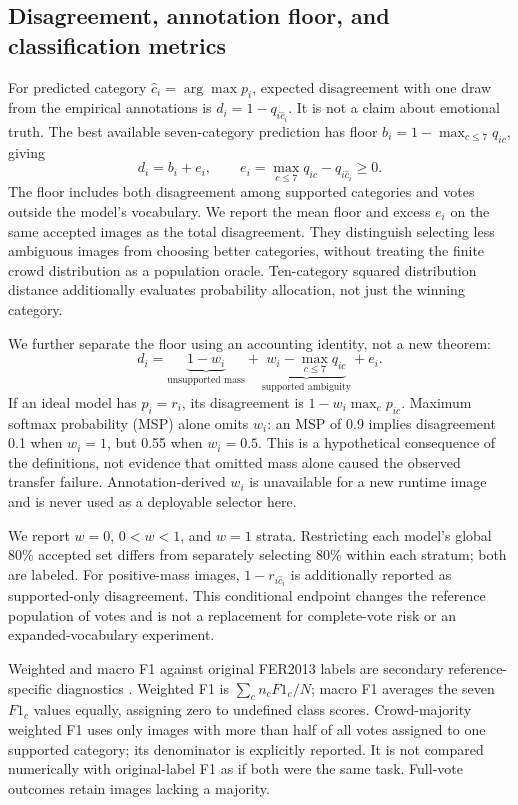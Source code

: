 \documentclass[pdflatex,sn-mathphys-num]{sn-jnl}
\begin{document}
\subsection{Disagreement, annotation floor, and classification metrics}
For predicted category $\hat c_i=\arg\max p_i$, expected disagreement with one draw from the empirical annotations is $d_i=1-q_{i\hat c_i}$. It is not a claim about emotional truth. The best available seven-category prediction has floor $b_i=1-\max_{c\leq7}q_{ic}$, giving
\begin{equation}
d_i=b_i+e_i,\qquad e_i=\max_{c\leq7}q_{ic}-q_{i\hat c_i}\geq0.
\label{eq:decomposition}
\end{equation}
The floor includes both disagreement among supported categories and votes outside the model's vocabulary. We report the mean floor and excess $e_i$ on the same accepted images as the total disagreement. They distinguish selecting less ambiguous images from choosing better categories, without treating the finite crowd distribution as a population oracle. Ten-category squared distribution distance additionally evaluates probability allocation, not just the winning category.

We further separate the floor using an accounting identity, not a new theorem:
\begin{equation}
d_i=\underbrace{1-w_i}_{\text{unsupported mass}}+
\underbrace{w_i-\max_{c\leq7}q_{ic}}_{\text{supported ambiguity}}+e_i.
\label{eq:threeparts}
\end{equation}
If an ideal model has $p_i=r_i$, its disagreement is $1-w_i\max_c p_{ic}$. Maximum softmax probability (MSP) alone omits $w_i$: an MSP of 0.9 implies disagreement 0.1 when $w_i=1$, but 0.55 when $w_i=0.5$. This is a hypothetical consequence of the definitions, not evidence that omitted mass alone caused the observed transfer failure. Annotation-derived $w_i$ is unavailable for a new runtime image and is never used as a deployable selector here.

We report $w=0$, $0<w<1$, and $w=1$ strata. Restricting each model's global 80\% accepted set differs from separately selecting 80\% within each stratum; both are labeled. For positive-mass images, $1-r_{i\hat c_i}$ is additionally reported as supported-only disagreement. This conditional endpoint changes the reference population of votes and is not a replacement for complete-vote risk or an expanded-vocabulary experiment.

Weighted and macro F1 against original FER2013 labels are secondary reference-specific diagnostics \cite{sokolova2009metrics}. Weighted F1 is $\sum_c n_c F1_c/N$; macro F1 averages the seven $F1_c$ values equally, assigning zero to undefined class scores. Crowd-majority weighted F1 uses only images with more than half of all votes assigned to one supported category; its denominator is explicitly reported. It is not compared numerically with original-label F1 as if both were the same task. Full-vote outcomes retain images lacking a majority.
\end{document}
